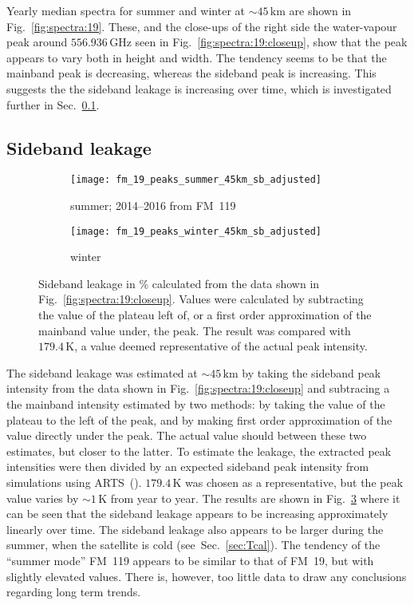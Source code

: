 \noindent
Yearly median spectra for summer and winter at $\sim45\,\mathrm{km}$ are shown
in Fig.~\ref{fig:spectra:19}.  These, and the close-ups of the right side the
water-vapour peak around $556.936\,\mathrm{GHz}$ seen in
Fig.~\ref{fig:spectra:19:closeup}, show that the peak appears to vary both in
height and width.  The tendency seems to be that the mainband peak is
decreasing, whereas the sideband peak is increasing.  This suggests the the
sideband leakage is increasing over time, which is investigated further in
Sec.~\ref{FM19:sbl}.


\subsection{Sideband leakage}
\label{FM19:sbl}

\begin{figure}[ht]
    \centering
    \begin{subfigure}[b]{0.9545\textwidth}
        \texttt{[image: fm\_19\_peaks\_summer\_45km\_sb\_adjusted]}
        \caption{summer; 2014--2016 from FM~119
            }\label{fig:sbl:19:summer}
    \end{subfigure}
    \begin{subfigure}[b]{0.9545\textwidth}
        \texttt{[image: fm\_19\_peaks\_winter\_45km\_sb\_adjusted]}
        \caption{winter}\label{fig:sbl:19:winter}
    \end{subfigure}
    \caption{Sideband leakage in \% calculated from the data shown in
        Fig.~\ref{fig:spectra:19:closeup}.  Values were calculated by
        subtracting the value of the plateau left of, or a first order
        approximation of the mainband value under, the peak.  The result was
        compared with $179.4\,\mathrm{K}$, a value deemed representative of the
        actual peak intensity.
        }\label{fig:sbl:19}
\end{figure}

\noindent
The sideband leakage was estimated at $\sim45\,\mathrm{km}$ by taking the
sideband peak intensity from the data shown in
Fig.~\ref{fig:spectra:19:closeup} and subtracing a the mainband intensity
estimated by two methods: by taking the value of the plateau to the left of the
peak, and by making first order approximation of the value directly under the
peak.  The actual value should between these two estimates, but closer to the
latter.  To estimate the leakage, the extracted peak intensities were then
divided by an expected sideband peak intensity from simulations
using ARTS~(\cite{buehler:artst:05}).  $179.4\,\mathrm{K}$ was chosen as a
representative, but the peak value varies by $\sim1\,\mathrm{K}$ from year to
year.  The results are shown in Fig.~\ref{fig:sbl:19} where it can be seen that
the sideband leakage appears to be increasing approximately linearly over time.
The sideband leakage also appears to be larger during the summer, when the
satellite is cold (see~Sec.~\ref{sec:Tcal}).  The tendency of the ``summer
mode'' FM~119 appears to be similar to that of FM~19, but with slightly
elevated values.  There is, however, too little data to draw any conclusions
regarding long term trends.


